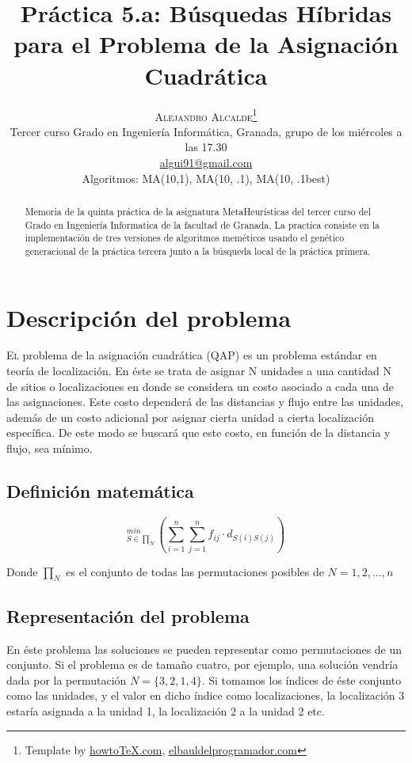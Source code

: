 \documentclass[twoside]{article}
\title{\vspace{-15mm}%
	\fontsize{24pt}{10pt}\selectfont
	\textbf{Práctica 5.a: Búsquedas Híbridas para el Problema de la
    Asignación Cuadrática}
	}
\author{%
	\large
	\textsc{Alejandro Alcalde}\thanks{Template by \href{http://www.howtotex.com}{howtoTeX.com}, \href{http://www.elbauldelprogramador.com}{elbauldelprogramador.com}} \\[2mm]
	\normalsize	Tercer curso Grado en Ingeniería Informática, Granada, grupo de los miércoles a las 17.30 \\
	\normalsize	\href{mailto:algui91@gmail.com}{algui91@gmail.com}	\\
	\normalsize Algoritmos: MA(10,1), MA(10, .1), MA(10, .1best)
	\vspace{-5mm}
	}
\date{}
\begin{document}
\maketitle
\thispagestyle{fancy}
\tableofcontents
\newpage

\begin{abstract}
\noindent Memoria de la quinta práctica de la asignatura MetaHeurísticas
del tercer curso del Grado en Ingeniería Informatica de la facultad de Granada.
La practica consiste en la implementación de tres versiones de algoritmos
meméticos usando el genético generacional de la práctica tercera junto
a la búsqueda local de la práctica primera.
\end{abstract}


\section{Descripción del problema}

\lettrine[nindent=0em,lines=3]{E}l problema de la asignación cuadrática (QAP) es un problema estándar en teoría de localización. En éste se trata de asignar N unidades a una cantidad N de sitios o localizaciones en donde se considera un costo asociado a cada una de las asignaciones. Este costo dependerá de las distancias y flujo entre las unidades, además de un costo adicional por asignar cierta unidad a cierta localización específica. De este modo se buscará que este costo, en función de la distancia y flujo, sea mínimo.

\subsection{Definición matemática}

\begin{displaymath}
_{S\in\prod _N}^{min}\left ( \sum_{i=1}^n \sum_{j=1}^n f_{ij} \cdot d_{S(i)S(j)}  \right )
\end{displaymath}

Donde $\prod _N$ es el conjunto de todas las permutaciones posibles de $N={1,2,\dots,n}$

\subsection{Representación del problema}

En éste problema las soluciones se pueden representar como permutaciones de un conjunto. Si el problema es de tamaño cuatro, por ejemplo, una solución vendría dada por la permutación $N=\{3,2,1,4\}$. Si tomamos los índices de éste conjunto como las unidades, y el valor en dicho índice como localizaciones, la localización 3 estaría asignada a la unidad 1, la localización 2 a la unidad 2 etc.
\end{document}
